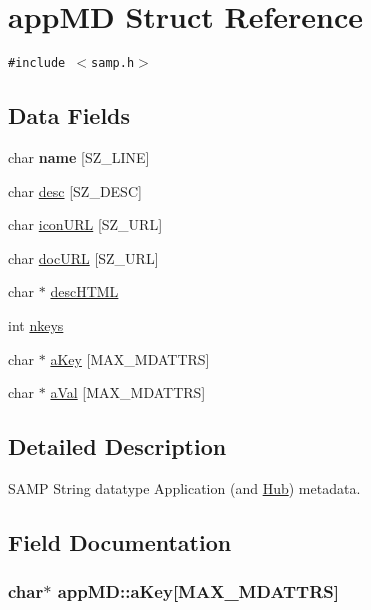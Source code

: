 \hypertarget{structappMD}{
\section{appMD Struct Reference}
\label{structappMD}
}
{\tt \#include $<$samp.h$>$}

\subsection*{Data Fields}
\begin{CompactItemize}
\item 
\hypertarget{structappMD_97a409d1e2c7049beb084c21a6f8bcd7}{
char \textbf{name} \mbox{[}SZ\_\-LINE\mbox{]}}
\label{structappMD_97a409d1e2c7049beb084c21a6f8bcd7}

\item 
char \hyperlink{structappMD_48da832ef8b712799c6116a7b68b2af2}{desc} \mbox{[}SZ\_\-DESC\mbox{]}
\item 
char \hyperlink{structappMD_dd9526ffaf4770718df3af848969991b}{iconURL} \mbox{[}SZ\_\-URL\mbox{]}
\item 
char \hyperlink{structappMD_af239c547b2c9344777146526d2112f8}{docURL} \mbox{[}SZ\_\-URL\mbox{]}
\item 
char $\ast$ \hyperlink{structappMD_7bc6e0aa888da1fb24f7d408d14ea814}{descHTML}
\item 
int \hyperlink{structappMD_4b9f5ebb7d20beb53a7bfe192009e89a}{nkeys}
\item 
char $\ast$ \hyperlink{structappMD_438cb7b3d47fb9e96af985574ff5c6d0}{aKey} \mbox{[}MAX\_\-MDATTRS\mbox{]}
\item 
char $\ast$ \hyperlink{structappMD_7359c333bffd1d2a9166b738bba85683}{aVal} \mbox{[}MAX\_\-MDATTRS\mbox{]}
\end{CompactItemize}


\subsection{Detailed Description}
SAMP String datatype Application (and \hyperlink{structHub}{Hub}) metadata. 

\subsection{Field Documentation}
\hypertarget{structappMD_438cb7b3d47fb9e96af985574ff5c6d0}{
\subsubsection[{aKey}]{\setlength{\rightskip}{0pt plus 5cm}char$\ast$ {\bf appMD::aKey}\mbox{[}MAX\_\-MDATTRS\mbox{]}}}
\label{structappMD_438cb7b3d47fb9e96af985574ff5c6d0}


